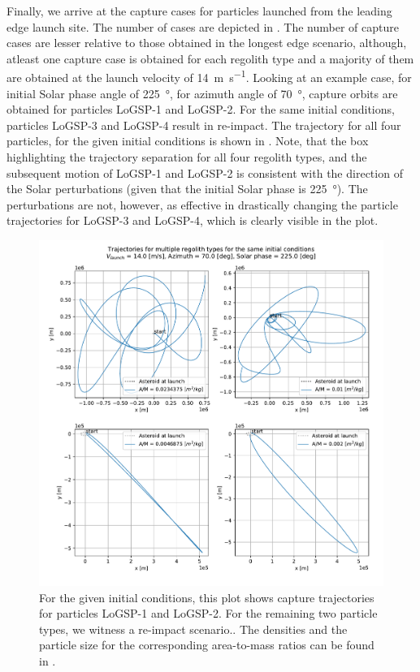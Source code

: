 Finally, we arrive at the capture cases for particles launched from the leading edge launch site. The number of cases are depicted in . The number of capture cases are lesser relative to those obtained in the longest edge scenario, although, atleast one capture case is obtained for each regolith type and a majority of them are obtained at the launch velocity of \SI{14}{\metre\per\second}. Looking at an example case, for initial Solar phase angle of \SI{225}{\degree}, for azimuth angle of \SI{70}{\degree}, capture orbits are obtained for particles LoGSP-1 and LoGSP-2. For the same initial conditions, particles LoGSP-3 and LoGSP-4 result in re-impact. The trajectory for all four particles, for the given initial conditions is shown in . Note, that the box highlighting the trajectory separation for all four regolith types, and the subsequent motion of LoGSP-1 and LoGSP-2 is consistent with the direction of the Solar perturbations (given that the initial Solar phase is \SI{225}{\degree}). The perturbations are not, however, as effective in drastically changing the particle trajectories for LoGSP-3 and LoGSP-4, which is clearly visible in the plot.
\begin{figure}[htb]
\centering
\captionsetup{justification=centering}
\includegraphics[width=\textwidth, height=0.6\textheight, keepaspectratio=true]{leading_edge_perturbations/capture_reimpact_scenario_14ms_70Azim_225SolarPhase_individualTrajPlots.pdf}
\caption{For the given initial conditions, this plot shows capture trajectories for particles LoGSP-1 and LoGSP-2. For the remaining two particle types, we witness a re-impact scenario.. The densities and the particle size for the corresponding area-to-mass ratios can be found in .}
\label{fig:capture_reimpact_traj_14ms_70Azim_225solarPhase_leadingEdge}
\end{figure}
\FloatBarrier


